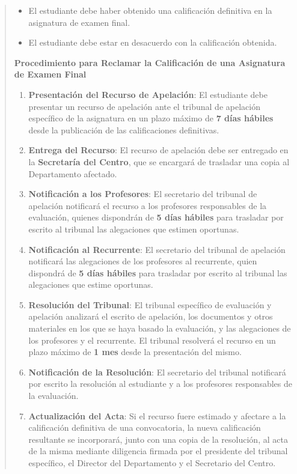\documentclass[12pt,a4paper,oneside]{report}
\begin{document}
\begin{itemize}
\begin{itemize}
\begin{quote}
\begin{itemize}
  \item El estudiante debe haber obtenido una calificación definitiva en la asignatura de examen final.
  \item El estudiante debe estar en desacuerdo con la calificación obtenida.
\end{itemize}


\noindent\textbf{Procedimiento para Reclamar la Calificación de una Asignatura de Examen Final}\\

\begin{enumerate}
  \item \textbf{Presentación del Recurso de Apelación}: El estudiante debe presentar un recurso de apelación ante el tribunal de apelación específico de la asignatura en un plazo máximo de \textbf{7 días hábiles} desde la publicación de las calificaciones definitivas.
  \item \textbf{Entrega del Recurso}: El recurso de apelación debe ser entregado en la \textbf{Secretaría del Centro}, que se encargará de trasladar una copia al Departamento afectado.
  \item \textbf{Notificación a los Profesores}: El secretario del tribunal de apelación notificará el recurso a los profesores responsables de la evaluación, quienes dispondrán de \textbf{5 días hábiles} para trasladar por escrito al tribunal las alegaciones que estimen oportunas.
  \item \textbf{Notificación al Recurrente}: El secretario del tribunal de apelación notificará las alegaciones de los profesores al recurrente, quien dispondrá de \textbf{5 días hábiles} para trasladar por escrito al tribunal las alegaciones que estime oportunas.
  \item \textbf{Resolución del Tribunal}: El tribunal específico de evaluación y apelación analizará el escrito de apelación, los documentos y otros materiales en los que se haya basado la evaluación, y las alegaciones de los profesores y el recurrente. El tribunal resolverá el recurso en un plazo máximo de \textbf{1 mes} desde la presentación del mismo.
  \item \textbf{Notificación de la Resolución}: El secretario del tribunal notificará por escrito la resolución al estudiante y a los profesores responsables de la evaluación.
  \item \textbf{Actualización del Acta}: Si el recurso fuere estimado y afectare a la calificación definitiva de una convocatoria, la nueva calificación resultante se incorporará, junto con una copia de la resolución, al acta de la misma mediante diligencia firmada por el presidente del tribunal específico, el Director del Departamento y el Secretario del Centro.
\end{enumerate}



\end{quote}
\end{itemize}
\end{itemize}
\end{document}
